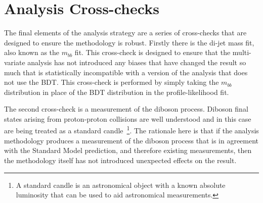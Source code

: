 \section{Analysis Cross-checks}

The final elements of the analysis strategy are a series of cross-checks that
are designed to ensure the methodology is robust. Firstly there is the di-jet
mass fit, also known as the $m_{bb}$ fit. This cross-check is designed to ensure
that the multi-variate analysis has not introduced any biases that have changed
the result so much that is statistically incompatible with a version of the
analysis that does not use the BDT. This cross-check is performed by simply
taking the $m_{bb}$ distribution in place of the BDT distribution in the
profile-likelihood fit.

The second cross-check is a measurement of the diboson process. Diboson final
states arising from proton-proton collisions are well understood and in this
case are being treated as a standard candle~\footnote{A standard candle is an
  astronomical object with a known absolute luminosity that can be used to aid
  astronomical measurements. }. The rationale here is that if the analysis
methodology produces a measurement of the diboson process that is in agreement
with the Standard Model prediction, and therefore existing measurements, then
the methodology itself has not introduced unexpected effects on the result.




